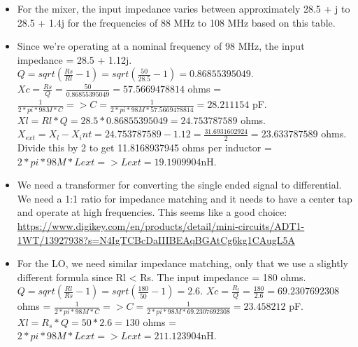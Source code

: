 \documentclass[12pt, letterpaper]{article}
\begin{document}
\begin{itemize}
    \item For the mixer, the input impedance varies between approximately 28.5 + j to 28.5 + 1.4j for the frequencies of 88 MHz to 108 MHz based on this table. 
    \item Since we're operating at a nominal frequency of 98 MHz, the input impedance = 28.5 + 1.12j. \(Q = sqrt(\frac{Rs}{Rl} - 1) = sqrt(\frac{50}{28.5} - 1) = 0.86855395049\). \(Xc = \frac{Rs}{Q} = \frac{50}{0.86855395049} = 57.5669478814 \) ohms = \( \frac{1}{2*pi*98M*C} => C = \frac{1}{2*pi*98M*57.5669478814} = 28.211154 \) pF. \( Xl = Rl*Q = 28.5*0.86855395049 = 24.753787589 \) ohms. \( X_{ext} = X_l - X_int = 24.753787589 - 1.12 = \frac{31.6931602924}{2} = 23.633787589 \) ohms. Divide this by 2 to get 11.8168937945 ohms per inductor = \(2*pi*98M*Lext => Lext = 19.1909904 \)nH.
    \item We need a transformer for converting the single ended signal to differential. We need a 1:1 ratio for impedance matching and it needs to have a center tap and operate at high frequencies. This seems like a good choice: \url{https://www.digikey.com/en/products/detail/mini-circuits/ADT1-1WT/13927938?s=N4IgTCBcDaIIIBEAqBGAtCg6kg1CAugL5A}
    \item For the LO, we need similar impedance matching, only that we use a slightly different formula since Rl < Rs. The input impedance = 180 ohms. \(Q = sqrt(\frac{Rl}{Rs} - 1) = sqrt(\frac{180}{50} - 1) = 2.6\). \(Xc = \frac{R_l}{Q} = \frac{180}{2.6} = 69.2307692308 \) ohms = \( \frac{1}{2*pi*98M*C} => C = \frac{1}{2*pi*98M*69.2307692308} = 23.458212 \) pF. \( Xl = R_s*Q = 50*2.6 = 130 \) ohms = \(2*pi*98M*Lext => Lext = 211.123904 \)nH.
\end{itemize}
\end{document}

